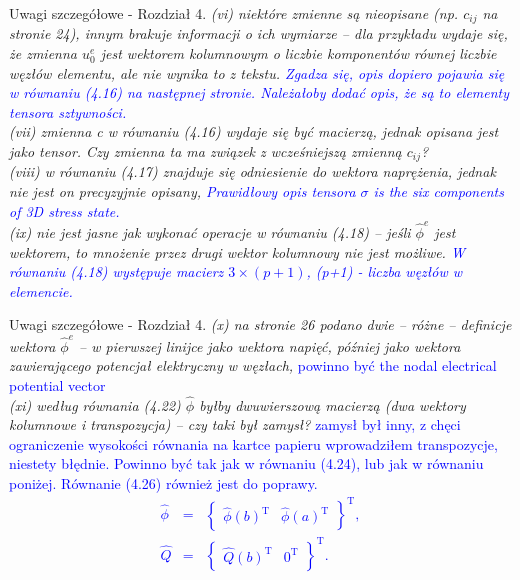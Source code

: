 \documentclass[10pt,aspectratio=169]{beamer} %
\begin{document}
\begin{frame}[label=frame4]{Uwagi szczegółowe - Rozdział 4.}\justifying
\textit{(vi) niektóre zmienne są nieopisane (np. \(c_{ij}\) na stronie 24), innym brakuje informacji o ich wymiarze – dla przykładu wydaje się, że zmienna \(u_0^e\) jest wektorem kolumnowym o liczbie komponentów równej liczbie węzłów elementu, ale nie wynika to z tekstu. \textcolor{blue}{Zgadza się, opis dopiero pojawia się w równaniu (4.16) na następnej stronie. Należałoby dodać opis, że są to elementy tensora sztywności.}\\
(vii) zmienna c w równaniu (4.16) wydaje się być macierzą, jednak opisana jest jako	tensor. Czy zmienna ta ma związek z wcześniejszą zmienną \(c_{ij}\)?\\
(viii) w równaniu (4.17) znajduje się odniesienie do wektora naprężenia, jednak nie	jest on precyzyjnie opisany, \textcolor{blue}{Prawidłowy opis tensora \(\sigma\) is the six components of 3D stress state.}\\
(ix) nie jest jasne jak wykonać operacje w równaniu (4.18) – jeśli \(\hat{\phi}^e\) jest wektorem, to mnożenie przez drugi wektor kolumnowy nie jest możliwe. \textcolor{blue}{W równaniu (4.18) występuje macierz \(3\times(p+1)\), (p+1) - liczba węzłów w elemencie.}}
\end{frame}
\begin{frame}[label=frame4]{Uwagi szczegółowe - Rozdział 4.}\justifying
\textit{(x) na stronie 26 podano dwie – różne – definicje wektora \(\hat{\phi}^e\) – w pierwszej linijce jako wektora napięć, później jako wektora zawierającego potencjał elektryczny w węzłach,} \textcolor{blue}{powinno być the nodal electrical potential vector}\\
\textit{(xi) według równania (4.22) \(\hat{\phi}\) byłby dwuwierszową macierzą (dwa wektory 	kolumnowe i transpozycja) – czy taki był zamysł?} \textcolor{blue}{zamysł był inny, z chęci ograniczenie wysokości równania na kartce papieru wprowadziłem transpozycje, niestety błędnie. Powinno być tak jak w równaniu (4.24), lub jak w równaniu poniżej. Równanie (4.26) również jest do poprawy.
\begin{eqnarray}
\widehat{\phi} & = & \left \{\begin{array}{cc}
\widehat{\phi}(b)^{\mathrm{T}} &
\widehat{\phi}(a)^{\mathrm{T}}
\end{array}\right \}^{\mathrm{T}},\\
\widehat{Q} & = & \left \{\begin{array}{cc}
\widehat{Q}(b)^{\mathrm{T}} & 0^{\mathrm{T}}
\end{array}\right \}^{\mathrm{T}}.
\end{eqnarray}}
\end{frame}
\end{document}
